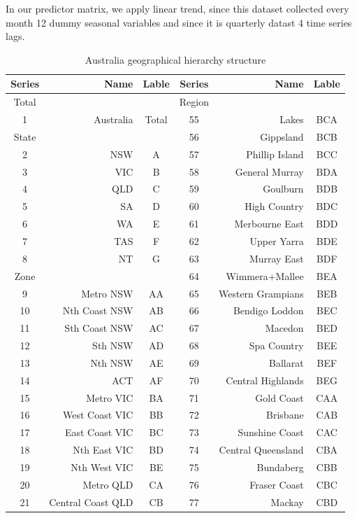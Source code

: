 \documentclass[11pt,a4paper,]{article}
\begin{document}
In our predictor matrix, we apply linear trend, since this dataset
collected every month 12 dummy seasonal variables and since it is
quarterly datast 4 time series lags.

\begin{table}[t]

\caption{\label{tab:Australiageographicaldivision}Australia geographical hierarchy structure}
\centering
\fontsize{9}{11}\selectfont
\begin{tabular}{crccrc}
\toprule
Series & Name & Lable & Series & Name & Lable\\
\midrule
Total &  &  & Region &  & \\
1 & Australia & Total & 55 & Lakes & BCA\\
State &  &  & 56 & Gippsland & BCB\\
2 & NSW & A & 57 & Phillip Island & BCC\\
3 & VIC & B & 58 & General Murray & BDA\\
4 & QLD & C & 59 & Goulburn & BDB\\
5 & SA & D & 60 & High Country & BDC\\
6 & WA & E & 61 & Merbourne East & BDD\\
7 & TAS & F & 62 & Upper Yarra & BDE\\
8 & NT & G & 63 & Murray East & BDF\\
Zone &  &  & 64 & Wimmera+Mallee & BEA\\
9 & Metro NSW & AA & 65 & Western Grampians & BEB\\
10 & Nth Coast NSW & AB & 66 & Bendigo Loddon & BEC\\
11 & Sth Coast NSW & AC & 67 & Macedon & BED\\
12 & Sth NSW & AD & 68 & Spa Country & BEE\\
13 & Nth NSW & AE & 69 & Ballarat & BEF\\
14 & ACT & AF & 70 & Central Highlands & BEG\\
15 & Metro VIC & BA & 71 & Gold Coast & CAA\\
16 & West Coast VIC & BB & 72 & Brisbane & CAB\\
17 & East Coast VIC & BC & 73 & Sunshine Coast & CAC\\
18 & Nth East VIC & BD & 74 & Central Queensland & CBA\\
19 & Nth West VIC & BE & 75 & Bundaberg & CBB\\
20 & Metro QLD & CA & 76 & Fraser Coast & CBC\\
21 & Central Coast QLD & CB & 77 & Mackay & CBD\\

\end{tabular}
\end{table}
\end{document}
